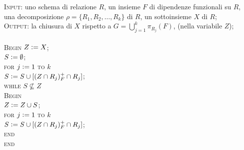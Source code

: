 \begin{alg}
\textsc{Input}: uno schema di relazione $R$, un insieme $F$ di dipendenze funzionali su $R$, una
decomposizione $\rho =\{R_1, R_2, \ldots, R_k\}$ di $R$, un sottoinsieme $X$ di $R$;\\
\textsc{Output}: la chiusura di $X$ rispetto a $G = \bigcup_{j=1}^k \pi_{R_j}(F)$, (nella variabile $Z$);\\\\
\textsc{Begin}
$Z\vcentcolon = X$;\\
$S\vcentcolon = \emptyset$;\\
\textsc{for} $j\vcentcolon = 1$ \textsc{to} $k$\\
\indent$S \vcentcolon= S \cup [(Z \cap R_j)^{+}_F \cap R_j]$;\\
\textsc{while} $S \not\subseteq Z$\\
\indent \textsc{Begin}\\
\indent $Z\vcentcolon = Z \cup S$;\\
\indent \textsc{for} $j\vcentcolon= 1$ \textsc{to} $k$\\
\indent \indent $S\vcentcolon= S \cup [(Z \cap R_j)^{+}_F \cap R_j]$;\\
\indent \textsc{end}\\
\textsc{end}\\
\end{alg}
